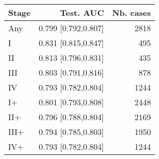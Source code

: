 \begin{table}[ht]
\centering
\begin{tabular}{lrr}
  \toprule
Stage & Test. AUC & Nb. cases \\ 
  \midrule
Any & 0.799 [0.792,0.807] & 2818 \\ 
   \addlinespace
I & 0.831 [0.815,0.847] & 495 \\ 
  II & 0.813 [0.796,0.831] & 435 \\ 
  III & 0.803 [0.791,0.816] & 878 \\ 
  IV & 0.793 [0.782,0.804] & 1244 \\ 
   \addlinespace
I+ & 0.801 [0.793,0.808] & 2448 \\ 
  II+ & 0.796 [0.788,0.804] & 2169 \\ 
  III+ & 0.794 [0.785,0.803] & 1950 \\ 
  IV+ & 0.793 [0.782,0.804] & 1244 \\ 
   \bottomrule
\end{tabular}
\end{table}
